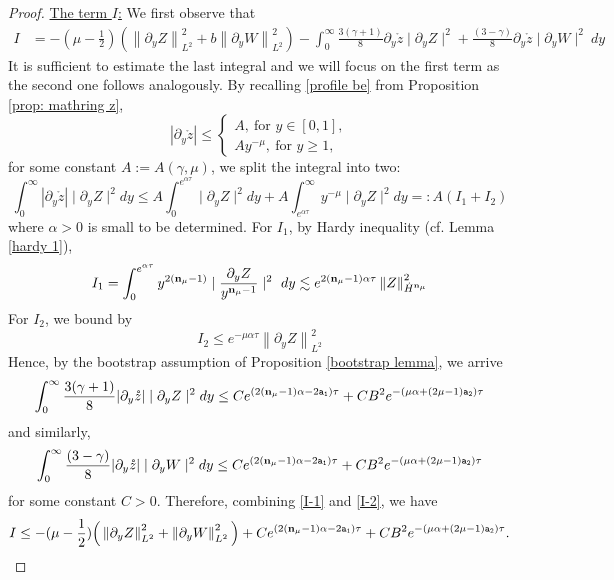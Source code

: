 \documentclass{article}
\newcommand{\norm}[1]{\left\lVert#1\right\rVert}
\newcommand{\ga}{\gamma}
\newcommand{\al}{\alpha}
\newcommand{\pa}{\partial}
\def\beqa{\begin{equation}\begin{aligned}}
\def\eeqa{\end{aligned}\end{equation}}
\def\espz{Z}
\def\espw{W}
\def\epone{\mathtt{a_1}}
\def\eptwo{\mathtt{a_2}}
\def\ndmu{{\bf{n}_{\mu}}}
\numberwithin{equation}{section}
\begin{document}
\begin{proof}
    \noindent\underline{The term $I$:} We first observe that  
    \[
    \begin{split}
    I &= - (\mu - \frac12) (\norm{\pa_y\espz}_{L^2}^2+ b \norm{\pa_y\espw}_{L^2}^2 ) - \int_{0}^\infty \frac{3(\ga+1)}{8}\partial_y \mathring z \mid \pa_y \espz\mid^2 +  \frac{(3-\ga)}{8}\partial_y\mathring z  \mid \pa_y \espw \mid^2 \ dy 
    \end{split}
    \] 
    It is sufficient to estimate the last integral and we will focus on the first term as the second one follows analogously. By recalling \eqref{profile be} from Proposition \ref{prop: mathring z},  
    	$$ |\pa_y\mathring z|\leq \begin{cases}
		A,\ \text{for } y\in[0,1],\\
		Ay^{-\mu},\ \text{for } y \ge 1,
	\end{cases}$$
	for some constant $A:=A(\ga,\mu)$,   
   we split the integral into two: 
   \[
  \int_{0}^\infty |\partial_y \mathring z |   \mid \pa_y \espz\mid^2  dy  \le A\int_{0}^{e^{\alpha\tau}}  \mid \pa_y \espz\mid^2  dy  +A \int_{e^{\alpha\tau}}^{\infty}
 y^{-\mu} \mid \pa_y \espz\mid^2   dy =: A (I_1+  I_2)
    \]
   where $\alpha>0$ is small to be determined. For $I_1$, by Hardy inequality (cf. Lemma \ref{hardy 1}),  
    \[
I_1 = \int_{0}^{e^{\al\tau}}y^{2(\ndmu-1)}\mid \frac{\pa_y \espz}{y^{\ndmu-1}}\mid^2 \ dy  
		\lesssim e^{2(\ndmu-1)\al\tau} \norm{\espz}_{\dot H^\ndmu}^2
    \]
 For $I_2$, we bound by 
 \[
 I_2 \le e^{-\mu \alpha \tau} \norm{\pa_y \espz}_{L^2} ^2 
 \]
	Hence, by the bootstrap assumption of Proposition \ref{bootstrap lemma}, we arrive 
	\beqa\label{I-1}
     \int_{0}^\infty\frac{3(\ga+1)}{8}  |\partial_y \mathring z|   \mid \pa_y \espz\mid^2  dy   \le C e^{(2(\ndmu-1)\al-2\epone) \tau}  + C B^2 e^{-(\mu\al+(2\mu-1)\eptwo)\tau} 
	\eeqa and  
   similarly, 
	\beqa\label{I-2}
      \int_{0}^\infty\frac{(3-\ga)}{8}  | \partial_y \mathring z  | \mid \pa_y \espw\mid^2  dy  \le C e^{(2(\ndmu-1)\al-2\epone) \tau}  + C B^2 e^{-(\mu\al+(2\mu-1)\eptwo)\tau}
	\eeqa
     for some constant $C>0$. 
	Therefore, combining \eqref{I-1} and \eqref{I-2}, we have 
	\beqa\label{I}
		I \leq -(\mu-\frac{1}{2} ) \Big(\norm{\pa_y \espz}_{L^2}^2 +\norm{\pa_y \espw}_{L^2} ^2\Big) + C e^{(2(\ndmu-1)\al-2\epone) \tau} + CB^2 e^{-(\mu\al+(2\mu-1)\eptwo)\tau}.
	\eeqa
	

\end{proof}
\end{document}
